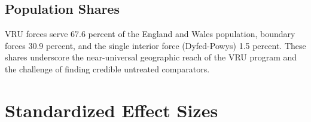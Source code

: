 \documentclass[12pt]{article}
\begin{document}
\subsection{Population Shares}

VRU forces serve 67.6 percent of the England and Wales population, boundary forces 30.9 percent, and the single interior force (Dyfed-Powys) 1.5 percent. These shares underscore the near-universal geographic reach of the VRU program and the challenge of finding credible untreated comparators.


\section{Standardized Effect Sizes}
\label{sec:sde}


\end{document}
